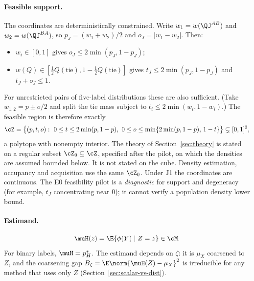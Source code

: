 \paragraph{Feasible support.}
The coordinates are deterministically constrained. Write $w_1=w(\QJ^{AB})$ and $w_2=w(\QJ^{BA})$,
so $p_J=(w_1+w_2)/2$ and $o_J=|w_1-w_2|$. Then:
\begin{itemize}
  \item $w_i\in[0,1]$ gives $o_J\le2\min(p_J,1-p_J)$;
  \item $w(Q)\in[\tfrac12Q(\text{tie}),1-\tfrac12Q(\text{tie})]$ gives $t_J\le2\min(p_J,1-p_J)$ and
        $t_J+o_J\le1$.
\end{itemize}
For unrestricted pairs of five-label distributions these are also sufficient. (Take
$w_{1,2}=p\pm o/2$ and split the tie mass subject to $t_i\le2\min(w_i,1-w_i)$.) The feasible region
is therefore exactly
\[
  \cZ=\bigl\{(p,t,o):\ 0\le t\le2\min(p,1-p),\ 0\le o\le\min\{2\min(p,1-p),\,1-t\}\bigr\}
  \subsetneq[0,1]^3 ,
\]
a polytope with nonempty interior. The theory of Section~\ref{sec:theory} is stated on a regular
subset $\cZ_0\subseteq\cZ$, specified after the pilot, on which the densities are assumed bounded
below. It is not stated on the cube. Density estimation, occupancy and acquisition use the same
$\cZ_0$. Under J1 the coordinates are continuous. The E0 feasibility pilot is a
\emph{diagnostic} for support and degeneracy (for example, $t_J$ concentrating near $0$); it cannot
verify a population density lower bound.

\paragraph{Estimand.}
\[
  \muH(z)=\E\{\phi(Y)\mid Z=z\}\in\cM .
\]
For binary labels, $\muH=p_H^{*}$. The estimand depends on $\zeta$: it is $\mu_X$ coarsened to $Z$,
and the coarsening gap $B_\zeta=\E\norm{\muH(Z)-\mu_X}^2$ is irreducible for any method that uses
only $Z$ (Section~\ref{sec:scalar-vs-dist}).

